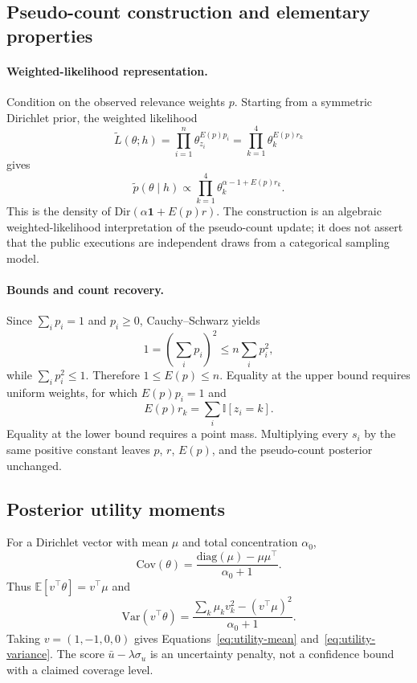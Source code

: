 \documentclass{article}
\newcommand{\E}{\mathbb{E}}
\newcommand{\ind}{\mathbb{I}}
\begin{document}
\subsection{Pseudo-count construction and elementary properties}

\paragraph{Weighted-likelihood representation.}
Condition on the observed relevance weights $p$. Starting from a symmetric Dirichlet prior, the weighted likelihood
\begin{equation}
\widetilde L(\theta;h)
=\prod_{i=1}^{n}\theta_{z_i}^{E(p)p_i}
=\prod_{k=1}^{4}\theta_k^{E(p)r_k}
\end{equation}
gives
\begin{equation}
\widetilde p(\theta\mid h)
\propto
\prod_{k=1}^{4}\theta_k^{\alpha-1+E(p)r_k}.
\end{equation}
This is the density of $\mathrm{Dir}(\alpha\mathbf 1+E(p)r)$. The construction is an algebraic weighted-likelihood interpretation of the pseudo-count update; it does not assert that the public executions are independent draws from a categorical sampling model.

\paragraph{Bounds and count recovery.}
Since $\sum_i p_i=1$ and $p_i\ge0$, Cauchy--Schwarz yields
\[
1=\left(\sum_i p_i\right)^2\le n\sum_i p_i^2,
\]
while $\sum_i p_i^2\le1$. Therefore $1\le E(p)\le n$. Equality at the upper bound requires uniform weights, for which $E(p)p_i=1$ and
\[
E(p)r_k=\sum_i\ind[z_i=k].
\]
Equality at the lower bound requires a point mass. Multiplying every $s_i$ by the same positive constant leaves $p$, $r$, $E(p)$, and the pseudo-count posterior unchanged.

\subsection{Posterior utility moments}

For a Dirichlet vector with mean $\mu$ and total concentration $\alpha_0$,
\[
\mathrm{Cov}(\theta)
=\frac{\mathrm{diag}(\mu)-\mu\mu^\top}{\alpha_0+1}.
\]
Thus $\E[v^\top\theta]=v^\top\mu$ and
\[
\mathrm{Var}(v^\top\theta)
=\frac{\sum_k\mu_kv_k^2-(v^\top\mu)^2}{\alpha_0+1}.
\]
Taking $v=(1,-1,0,0)$ gives Equations~\ref{eq:utility-mean} and~\ref{eq:utility-variance}. The score $\bar u-\lambda\sigma_u$ is an uncertainty penalty, not a confidence bound with a claimed coverage level.
\end{document}
